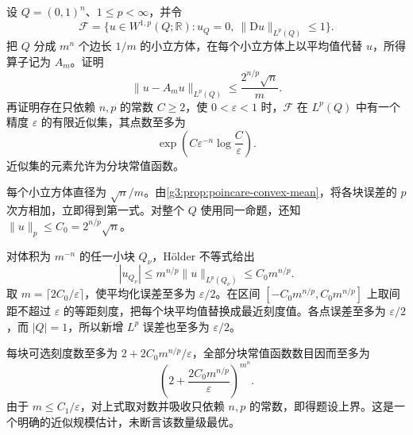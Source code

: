 \begin{exercise}\label{g3:ex:quantitative-sobolev-finite-net}
	设 \(Q=(0,1)^n\)、\(1\le p<\infty\)，并令
	\[
		\mathcal F=\{u\in W^{1,p}(Q;\mathbb R):u_Q=0,\ \|\mathrm D u\|_{L^p(Q)}\le1\}.
	\]
	把 \(Q\) 分成 \(m^n\) 个边长 \(1/m\) 的小立方体，在每个小立方体上以平均值代替 \(u\)，所得算子记为 \(A_m\)。证明
	\[
		\|u-A_mu\|_{L^p(Q)}\le\frac{2^{n/p}\sqrt n}{m}.
	\]
	再证明存在只依赖 \(n,p\) 的常数 \(C\ge2\)，使 \(0<\varepsilon<1\) 时，\(\mathcal F\) 在 \(L^p(Q)\) 中有一个精度 \(\varepsilon\) 的有限近似集，其点数至多为
	\[
		\exp\!\left(C\varepsilon^{-n}\log\frac C\varepsilon\right).
	\]
	近似集的元素允许为分块常值函数。
\end{exercise}
\begin{solution}
	每个小立方体直径为 \(\sqrt n/m\)。由\cref{g3:prop:poincare-convex-mean}，将各块误差的 \(p\) 次方相加，立即得到第一式。对整个 \(Q\) 使用同一命题，还知 \(\|u\|_p\le C_0=2^{n/p}\sqrt n\)。

	对体积为 \(m^{-n}\) 的任一小块 \(Q_\nu\)，Hölder 不等式给出
	\[
		|u_{Q_\nu}|\le m^{n/p}\|u\|_{L^p(Q_\nu)}\le C_0m^{n/p}.
	\]
	取 \(m=\lceil2C_0/\varepsilon\rceil\)，使平均化误差至多为 \(\varepsilon/2\)。在区间 \([-C_0m^{n/p},C_0m^{n/p}]\) 上取间距不超过 \(\varepsilon\) 的等距刻度，把每个块平均值替换成最近刻度值。各点误差至多为 \(\varepsilon/2\)，而 \(|Q|=1\)，所以新增 \(L^p\) 误差也至多为 \(\varepsilon/2\)。

	每块可选刻度数至多为 \(2+2C_0m^{n/p}/\varepsilon\)，全部分块常值函数数目因而至多为
	\[
		\left(2+\frac{2C_0m^{n/p}}\varepsilon\right)^{m^n}.
	\]
	由于 \(m\le C_1/\varepsilon\)，对上式取对数并吸收只依赖 \(n,p\) 的常数，即得题设上界。这是一个明确的近似规模估计，未断言该数量级最优。
\end{solution}

